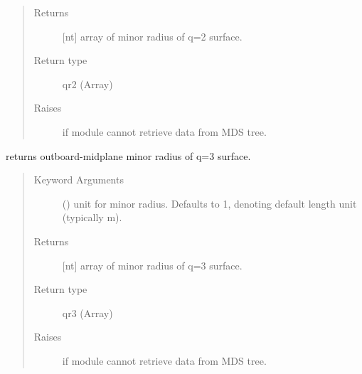 \documentclass[letterpaper,10pt,english]{sphinxmanual}
\begin{document}
\begin{fulllineitems}
\begin{fulllineitems}
\begin{quote}
\begin{description}
\item[{Returns}] \leavevmode
{[}nt{]} array of minor radius of q=2 surface.

\item[{Return type}] \leavevmode
qr2 (Array)

\item[{Raises}] \leavevmode
{} \textendash{} if module cannot retrieve data from MDS tree.

\end{description}\end{quote}

\end{fulllineitems}


\begin{fulllineitems}
\label{\detokenize{eqtools:eqtools.EFIT.EFITTree.getQ3Surf}}
returns outboard-midplane minor radius of q=3 surface.
\begin{quote}\begin{description}
\item[{Keyword Arguments}] \leavevmode
{} () \textendash{} unit for minor radius.  Defaults to 1,
denoting default length unit (typically m).

\item[{Returns}] \leavevmode
{[}nt{]} array of minor radius of q=3 surface.

\item[{Return type}] \leavevmode
qr3 (Array)

\item[{Raises}] \leavevmode
{} \textendash{} if module cannot retrieve data from MDS tree.

\end{description}\end{quote}

\end{fulllineitems}



\end{fulllineitems}
\end{document}
